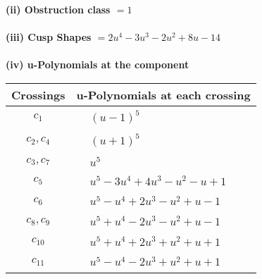 \documentclass[1p]{elsarticle_modified}
\theoremstyle{definition}
\begin{document}
\flushleft \textbf{(ii) Obstruction class $= 1$}\\~\\
\flushleft \textbf{(iii) Cusp Shapes $= 2 u^4-3 u^3-2 u^2+8 u-14$}\\~\\
\newpage\renewcommand{\arraystretch}{1}
\flushleft \textbf{(iv) u-Polynomials at the component}\newline \\
\begin{tabular}{m{50pt}|m{274pt}}
Crossings & \hspace{64pt}u-Polynomials at each crossing \\
\hline $$\begin{aligned}c_{1}\end{aligned}$$&$\begin{aligned}
&(u-1)^5
\end{aligned}$\\
\hline $$\begin{aligned}c_{2},c_{4}\end{aligned}$$&$\begin{aligned}
&(u+1)^5
\end{aligned}$\\
\hline $$\begin{aligned}c_{3},c_{7}\end{aligned}$$&$\begin{aligned}
&u^5
\end{aligned}$\\
\hline $$\begin{aligned}c_{5}\end{aligned}$$&$\begin{aligned}
&u^5-3 u^4+4 u^3- u^2- u+1
\end{aligned}$\\
\hline $$\begin{aligned}c_{6}\end{aligned}$$&$\begin{aligned}
&u^5- u^4+2 u^3- u^2+u-1
\end{aligned}$\\
\hline $$\begin{aligned}c_{8},c_{9}\end{aligned}$$&$\begin{aligned}
&u^5+u^4-2 u^3- u^2+u-1
\end{aligned}$\\
\hline $$\begin{aligned}c_{10}\end{aligned}$$&$\begin{aligned}
&u^5+u^4+2 u^3+u^2+u+1
\end{aligned}$\\
\hline $$\begin{aligned}c_{11}\end{aligned}$$&$\begin{aligned}
&u^5- u^4-2 u^3+u^2+u+1
\end{aligned}$\\
\hline
\end{tabular}\\~\\
\end{document}
